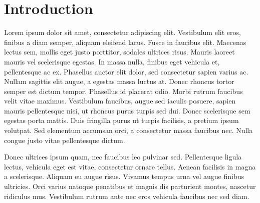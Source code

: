 \section{Introduction}
Lorem ipsum dolor sit amet, consectetur adipiscing elit. Vestibulum elit eros, finibus a diam semper, aliquam eleifend lacus. Fusce in faucibus elit. Maecenas lectus sem, mollis eget justo porttitor, sodales ultrices risus. Mauris laoreet mauris vel scelerisque egestas. In massa nulla, finibus eget vehicula et, pellentesque ac ex. Phasellus auctor elit dolor, sed consectetur sapien varius ac. Nullam sagittis elit augue, a egestas massa luctus at. Donec rhoncus tortor semper est dictum tempor. Phasellus id placerat odio. Morbi rutrum faucibus velit vitae maximus. Vestibulum faucibus, augue sed iaculis posuere, sapien mauris pellentesque nisi, ut rhoncus purus turpis sed dui. Donec scelerisque sem egestas porta mattis. Duis fringilla purus ut turpis facilisis, a pretium ipsum volutpat. Sed elementum accumsan orci, a consectetur massa faucibus nec. Nulla congue justo vitae pellentesque dictum.

Donec ultrices ipsum quam, nec faucibus leo pulvinar sed. Pellentesque ligula lectus, vehicula eget est vitae, consectetur ornare tellus. Aenean facilisis in magna a scelerisque. Aliquam eu augue risus. Vivamus tempus urna vel augue finibus ultricies. Orci varius natoque penatibus et magnis dis parturient montes, nascetur ridiculus mus. Vestibulum rutrum ante nec eros vehicula faucibus nec sed diam.